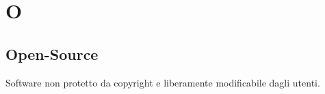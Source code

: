 \section*{O}
\subsection*{Open-Source}
Software non protetto da copyright e liberamente modificabile dagli utenti.

